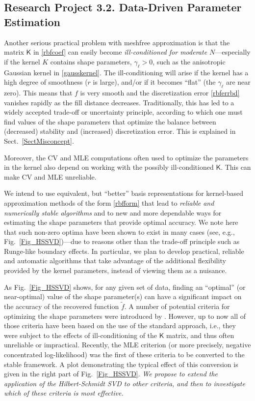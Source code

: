 \documentclass[11pt]{NSFamsart}
\newcommand{\tf}{\tilde{f}}
\newcommand{\mK}{\mathsf{K}}
\begin{document}
\subsection*{Research Project 3.2. Data-Driven Parameter Estimation} \label{parestsubsec}
Another serious practical problem with meshfree approximation is that the matrix $\mK$ in \eqref{rbfcoef} can easily become \emph{ill-conditioned for moderate $N$}---especially if the kernel $K$ contains shape parameters, $\gamma_\ell>0$, such as the anisotropic Gaussian kernel in \eqref{gausskernel}.  The ill-conditioning will arise if the kernel has a high degree of smoothness ($r$ is large), and/or if it becomes ``flat'' (the $\gamma_\ell$ are near zero). This means that $f$ is very smooth and the discretization error \eqref{rbferrbd} vanishes rapidly as the fill distance decreases.
Traditionally, this has led to a widely accepted trade-off or uncertainty principle, according to which one must find values of the shape parameters that optimize the balance between (decreased) stability and (increased) discretization error.  This is explained in Sect.\ \ref{SectMisconcept}.

Moreover, the CV and MLE computations often used to optimize the parameters in the kernel also depend on working with the possibly ill-conditioned $\mK$.  This can make CV and MLE unreliable.

We intend to use equivalent, but ``better'' basis representations for kernel-based approximation methods of the form \eqref{rbfform} that lead to \emph{reliable and numerically stable algorithms} and to new and more dependable ways for estimating the shape parameters that provide optimal accuracy. We note here that such non-zero optima have been shown to exist in many cases (see, e.g., Fig.~\ref{Fig_HSSVD})---due to reasons other than the trade-off principle such as Runge-like boundary effects. In particular, we plan to develop practical, reliable and automatic algorithms that take advantage of the additional flexibility provided by the kernel parameters, instead of viewing them as a nuisance.

As Fig.~\ref{Fig_HSSVD} shows, for any given set of data, finding an ``optimal'' (or near-optimal) value of the shape parameter(s) can have a significant impact on the accuracy of the recovered function $\tf$. A number of potential criteria for optimizing the shape parameters were introduced by \cite{Fasshauer11}. However, up to now all of those criteria have been based on the use of the standard approach, i.e., they were subject to the effects of ill-conditioning of the $\mK$ matrix, and thus often unreliable or impractical. Recently, the MLE criterion (or more precisely, negative concentrated log-likelihood) was the first of these criteria to be converted to the stable framework. A plot demonstrating the typical effect of this conversion is given in the right part of Fig.~\ref{Fig_HSSVD}. \emph{We propose to extend the application of the Hilbert-Schmidt SVD to other criteria, and then to investigate which of these criteria is most effective.}
\end{document}
